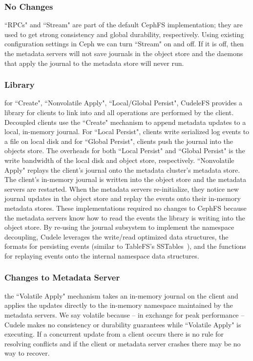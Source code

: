 \subsubsection{No Changes} ``RPCs" and ``Stream" are part of the default CephFS
implementation; they are used to get strong consistency and global durability,
respectively.  Using existing configuration settings in Ceph we can turn
``Stream" on and off.  If it is off, then the metadata servers will not save
journals in the object store and the daemons that apply the journal to the
metadata store will never run. 

\subsubsection{Library} for ``Create", ``Nonvolatile Apply", ``Local/Global
Persist", CudeleFS provides a library for clients to link into and all
operations are performed by the client.  Decoupled clients use the ``Create"
mechanism to append metadata updates to a local, in-memory journal.  For
``Local Persist", clients write serialized log events to a file on local disk
and for ``Global Persist", clients push the journal into the objects store. The
overheads for both ``Local Persist" and ``Global Persist" is the write
bandwidth of the local disk and object store, respectively.  ``Nonvolatile
Apply" replays the client's journal onto the metadata cluster's metadata store.
The client's in-memory journal is written into the object store and the
metadata servers are restarted. When the metadata servers re-initialize, they
notice new journal updates in the object store and replay the events onto their
in-memory metadata stores.  These implementations required no changes to CephFS
because the metadata servers know how to read the events the library is writing
into the object store.  By re-using the journal subsystem to implement the
namespace decoupling, Cudele leverages the write/read optimized data
structures, the formats for persisting events (similar to TableFS's
SSTables~\cite{ren:atc2013-tablefs}), and the functions for replaying events
onto the internal namespace data structures.  

\subsubsection{Changes to Metadata Server} the ``Volatile Apply" mechanism
takes an in-memory journal on the client and applies the updates directly to
the in-memory namespace maintained by the metadata servers. We say volatile
because -- in exchange for peak performance -- Cudele makes no consistency or
durability guarantees while ``Volatile Apply" is executing.  If a concurrent
update from a client occurs there is no rule for resolving conflicts and if the
client or metadata server crashes there may be no way to recover. 

